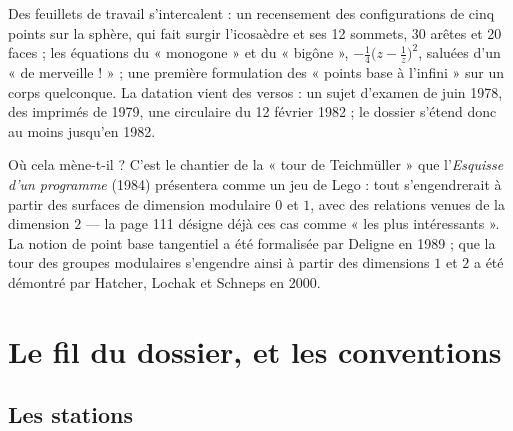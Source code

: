 \documentclass[11pt,a4paper]{article}
\begin{document}
\begin{resume}
Des feuillets de travail s'intercalent : un recensement des configurations de
cinq points sur la sphère, qui fait surgir l'icosaèdre et ses 12 sommets, 30
arêtes et 20 faces ; les équations du « monogone » et du « bigône »,
$-\frac14\bigl(z - \frac1z\bigr)^2$, saluées d'un « de merveille ! » ; une
première formulation des « points base à l'infini » sur un corps quelconque.
La datation vient des versos : un sujet d'examen de juin 1978, des imprimés de
1979, une circulaire du 12 février 1982 ; le dossier s'étend donc au moins
jusqu'en 1982.

Où cela mène-t-il ? C'est le chantier de la « tour de Teichmüller » que
l'\emph{Esquisse d'un programme} (1984) présentera comme un jeu de Lego : tout
s'engendrerait à partir des surfaces de dimension modulaire $0$ et $1$, avec
des relations venues de la dimension $2$ — la page 111 désigne déjà ces cas
comme « les plus intéressants ». La notion de point base tangentiel a été
formalisée par Deligne en 1989 ; que la tour des groupes modulaires
s'engendre ainsi à partir des dimensions $1$ et $2$ a été démontré par
Hatcher, Lochak et Schneps en 2000.

\end{resume}

\section*{Le fil du dossier, et les conventions}

\subsection*{Les stations}
\end{document}
